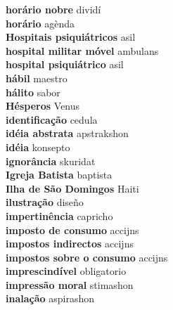 \textbf{ horário nobre  } dividí \\
\textbf{ horário  } agènda \\
\textbf{ Hospitais psiquiátricos  } asil \\
\textbf{ hospital militar móvel  } ambulans \\
\textbf{ hospital psiquiátrico  } asil \\
\textbf{ hábil  } maestro \\
\textbf{ hálito  } sabor \\
\textbf{ Hésperos  } Venus \\
\textbf{ identificação  } cedula \\
\textbf{ idéia abstrata  } apstrakshon \\
\textbf{ idéia  } konsepto \\
\textbf{ ignorância  } skuridat \\
\textbf{ Igreja Batista  } baptista \\
\textbf{ Ilha de São Domingos  } Haiti \\
\textbf{ ilustração  } diseño \\
\textbf{ impertinência  } capricho \\
\textbf{ imposto de consumo  } accijns \\
\textbf{ impostos indirectos  } accijns \\
\textbf{ impostos sobre o consumo  } accijns \\
\textbf{ imprescindível  } obligatorio \\
\textbf{ impressão moral  } stimashon \\
\textbf{ inalação  } aspirashon \\
